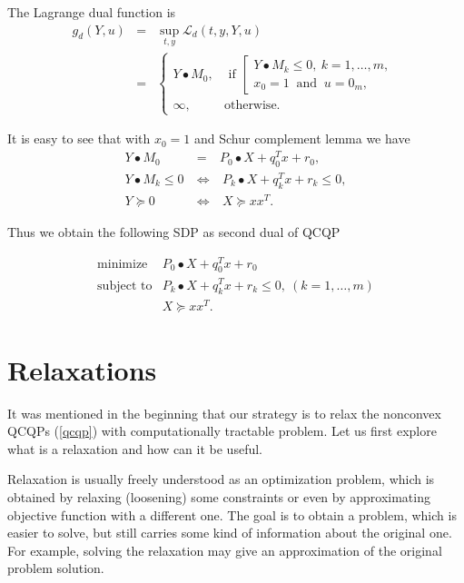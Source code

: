 \documentclass[12pt]{book}
\theoremstyle{definition}
\begin{document}
The Lagrange dual function is 
\begin{eqnarray*}
g_d(Y,u) &=& \sup_{t,y} \mathcal{L}_d(t,y,Y,u) \\
&=&  \left\lbrace\begin{array}{ll}
Y\bullet M_0, & \mbox{ if } \left[\begin{array}{l} 
		 					 Y\bullet M_k \leq 0, \ k = 1,\dots ,m, \\
		 					 x_0 = 1 \ \mbox{ and } \
			 				 u = 0_m, 
			 				 \end{array}\right. \\
\infty, & \mbox{otherwise.} 
\end{array}\right. 
\end{eqnarray*}

It is easy to see that with $x_0 = 1$ and Schur complement lemma we have
\begin{eqnarray*}
Y\bullet M_0 &=& P_0\bullet X + q_0^Tx + r_0, \\
Y\bullet M_k \leq 0 \ &\Leftrightarrow& \ P_k\bullet X+ q_k^Tx + r_k \leq 0,\\
Y\succeq 0 \ &\Leftrightarrow& \ X\succeq xx^T.
\end{eqnarray*}

Thus we obtain the following SDP as second dual of QCQP

\begin{equation}
\label{qcqpSecondDual} 
\begin{array}{ll}
\mbox{minimize}& P_0\bullet X + q_0^Tx + r_0\\
\mbox{subject to}& P_k\bullet X+ q_k^Tx + r_k \leq 0, \  (k = 1,\dots ,m)\\
& X\succeq xx^T.
\end{array} 
\end{equation}








\chapter{Relaxations}
\label{ChapterRelaxations}
It was mentioned in the beginning that our strategy is to relax the nonconvex QCQPs (\ref{qcqp}) with computationally tractable problem. Let us first explore what is a relaxation and how can it be useful. 

Relaxation is usually freely understood as an optimization problem, which is obtained by relaxing (loosening) some constraints or even by approximating objective function with a different one. The goal is to obtain a problem, which is easier to solve, but still carries some kind of information about the original one. For example, solving the relaxation may give an approximation of the original problem solution.
\end{document}
